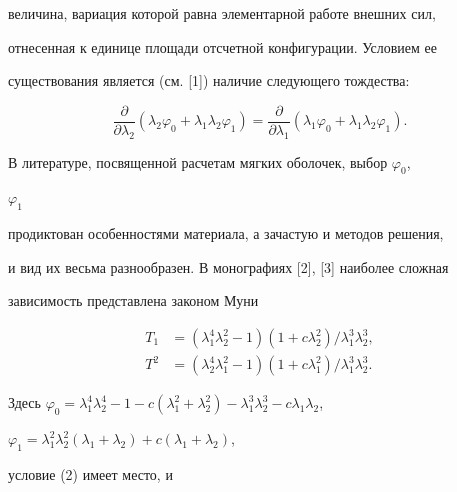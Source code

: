 величина, вариация которой равна элементарной работе внешних сил,


отнесенная к единице площади отсчетной конфигурации. Условием ее


существования является (см. [1]) наличие следующего тождества:


\begin{equation}


\frac{\partial}{\partial\lambda_2}(\lambda_2\varphi_0+


\lambda_1\lambda_2\varphi_1)=


\frac{\partial}{\partial\lambda_1}(\lambda_1\varphi_0+


\lambda_1\lambda_2\varphi_1).


\end{equation}





В литературе, посвященной расчетам мягких оболочек, выбор $\varphi_0$,


$\varphi_1$


продиктован особенностями материала, а зачастую и методов решения,


и вид их весьма разнообразен. В монографиях [2], [3] наиболее сложная


зависимость представлена законом Муни


\begin{equation}


\begin{split}


T_1&=(\lambda^4_1\lambda^2_2-1)(1+c\lambda^2_2)/


\lambda^3_1\lambda^3_2,\\


T^2&=(\lambda^4_2\lambda^2_1-1)(1+c\lambda^2_1)/


\lambda^3_1\lambda^3_2.


\end{split}


\end{equation}


Здесь $\varphi_0=\lambda^4_1\lambda^4_2-1-c(\lambda^2_1+


\lambda^2_2)-\lambda^3_1\lambda^3_2-c\lambda_1\lambda_2$,


$\varphi_1=\lambda^2_1\lambda^2_2(\lambda_1+\lambda_2)+


c(\lambda_1+\lambda_2)$,


условие (2) имеет место, и


$$


